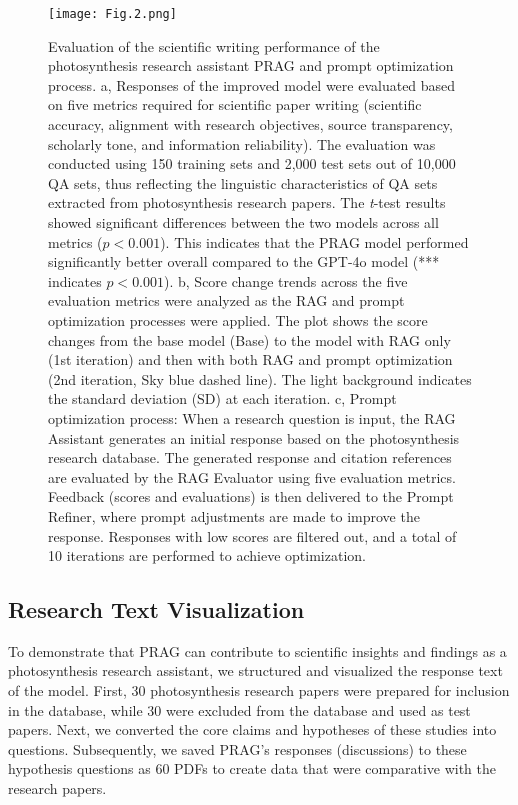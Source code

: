 \documentclass[12pt]{article}
\begin{document}
\begin{figure}
    \centering
    \texttt{[image: Fig.2.png]}
    \caption{Evaluation of the scientific writing performance of the photosynthesis research assistant PRAG and prompt optimization process. a, Responses of the improved model were evaluated based on five metrics required for scientific paper writing (scientific accuracy, alignment with research objectives, source transparency, scholarly tone, and information reliability). The evaluation was conducted using 150 training sets and 2,000 test sets out of 10,000 QA sets, thus reflecting the linguistic characteristics of QA sets extracted from photosynthesis research papers. The \textit{t}-test results showed significant differences between the two models across all metrics ($p < 0.001$). This indicates that the PRAG model performed significantly better overall compared to the GPT-4o model (*** indicates $p < 0.001$). b, Score change trends across the five evaluation metrics were analyzed as the RAG and prompt optimization processes were applied. The plot shows the score changes from the base model (Base) to the model with RAG only (1st iteration) and then with both RAG and prompt optimization (2nd iteration, Sky blue dashed line). The light background indicates the standard deviation (SD) at each iteration. c, Prompt optimization process: When a research question is input, the RAG Assistant generates an initial response based on the photosynthesis research database. The generated response and citation references are evaluated by the RAG Evaluator using five evaluation metrics. Feedback (scores and evaluations) is then delivered to the Prompt Refiner, where prompt adjustments are made to improve the response. Responses with low scores are filtered out, and a total of 10 iterations are performed to achieve optimization.}
    \label{fig:prag}
\end{figure}
\subsection{Research Text Visualization}
To demonstrate that PRAG can contribute to scientific insights and findings as a photosynthesis research assistant, we structured and visualized the response text of the model. First, 30 photosynthesis research papers were prepared for inclusion in the database, while 30 were excluded from the database and used as test papers. Next, we converted the core claims and hypotheses of these studies into questions. Subsequently, we saved PRAG's responses (discussions) to these hypothesis questions as 60 PDFs to create data that were comparative with the research papers.
\end{document}
